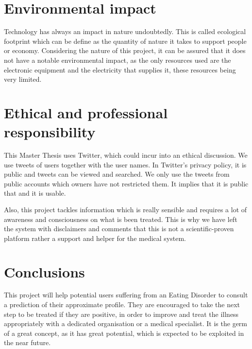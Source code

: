 \section{Environmental impact}

Technology has always an impact in nature undoubtedly. This is called ecological footprint which can be define as the quantity of nature it takes to support people or economy. Considering the nature of this project, it can be assured that it does not have a notable environmental impact, as the only resources used are the electronic equipment and the electricity that supplies it, these resources being very limited.

\section{Ethical and professional responsibility}

This Master Thesis uses Twitter, which could incur into an ethical discussion. We use tweets of users together with the user names. In Twitter's privacy policy, it is public and tweets can be viewed and searched. We only use the tweets from public accounts which owners have not restricted them. It implies that it is public that and it is usable.

Also, this project tackles information which is really sensible and requires a lot of awareness and consciousness on what is been treated. This is why we have left the system with disclaimers and comments that this is not a scientific-proven platform rather a support and helper for the medical system.

\section{Conclusions}

This project will help potential users suffering from an Eating Disorder to consult a prediction of their approximate profile. They are encouraged to take the next step to be treated if they are positive, in order to improve and treat the illness appropriately with a dedicated organisation or a medical specialist. It is the germ of a great concept, as it has great potential, which is expected to be exploited in the near future.
